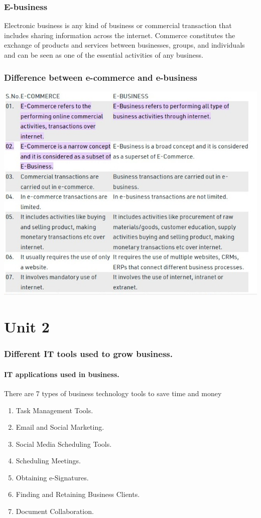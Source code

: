 \documentclass[a4paper]{article}
\begin{document}
\section{E-business}
Electronic business is any kind of business or commercial transaction that
includes sharing information across the internet. Commerce constitutes the
exchange of products and services between businesses, groups, and
individuals and can be seen as one of the essential activities of any
business.


\section{Difference between e-commerce and e-business}
\includegraphics[scale=0.7]{diffecomebuis}

\part{Unit 2}
\section{Different IT tools used to grow business.}
\subsection{IT applications used in business.}
There are 7 types of business technology tools to save time and money 

\begin{enumerate}
\item Task Management Tools.
\item Email and Social Marketing.
\item Social Media Scheduling Tools.
\item Scheduling Meetings.
\item Obtaining e-Signatures.
\item Finding and Retaining Business Clients.
\item Document Collaboration.
\end{enumerate}
\end{document}
